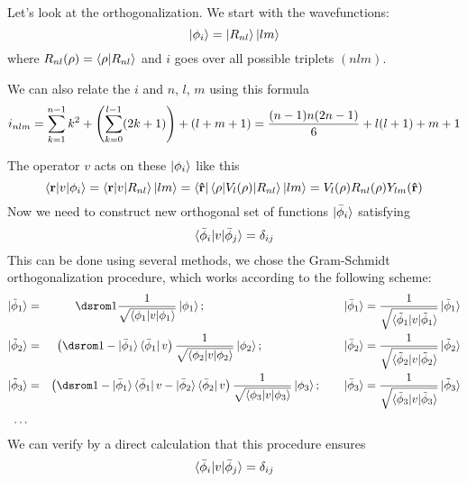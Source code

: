 Let's look at the orthogonalization. We start with the wavefunctions: 
\begin{equation*}
  \mathinner{|{\phi_i}\rangle}=\mathinner{|{R_{nl}}\rangle}\mathinner{|{lm}\rangle}
\end{equation*}
where $R_{nl}(\rho)=\mathinner{\langle{\rho|R_{nl}}\rangle}$ and $i$ goes over all possible triplets $(nlm)$.

We can also relate the $i$ and $n$, $l$, $m$ using this formula
\begin{equation*}
  i_{nlm}=\sum_{k=1}^{n-1}k^2+\left(\sum_{k=0}^{l-1} (2k+1)\right) + (l+m+1)= {(n-1)n(2n-1)\over6} + l(l+1)+m+1
\end{equation*}

The operator $v$ acts on these $\mathinner{|{\phi_i}\rangle}$ like this 
\begin{equation*}
  \mathinner{\langle{{\bf r}|v|\phi_i}\rangle} =\mathinner{\langle{{\bf r}|v|R_{nl}}\rangle}\mathinner{|{lm}\rangle} =\mathinner{\langle{{\bf\hat r}}|}\mathinner{\langle{\rho|V_l(\rho)|R_{nl}}\rangle}\mathinner{|{lm}\rangle} =V_l(\rho)R_{nl}(\rho)Y_{lm}({\bf\hat r})
\end{equation*}
Now we need to construct new orthogonal set of functions $\mathinner{|{\bar\phi_i}\rangle}$ satisfying 
\begin{equation*}
  \mathinner{\langle{\bar\phi_i|v|\bar\phi_j}\rangle}=\delta_{ij}
\end{equation*}
This can be done using several methods, we chose the Gram-Schmidt orthogonalization procedure, which works according to the following scheme: 
\begin{eqnarray*}
\ket{\tilde\phi_1}&=&\one{1\over\sqrt{\braket{\phi_1|v|\phi_1}}}\ket{\phi_1} ;\quad\quad \quad\quad\quad\quad\quad \quad\quad\quad\quad\quad \ket{\bar\phi_1}={1\over\sqrt{\braket{\tilde\phi_1|v|\tilde\phi_1}}} \ket{\tilde\phi_1} \\
\ket{\tilde\phi_2}&=& \left(\one -\ket{\bar\phi_1}\bra{\bar\phi_1}v \right){1\over\sqrt{\braket{\phi_2|v|\phi_2}}}\ket{\phi_2};\quad\quad \quad\quad\quad\quad\quad \ket{\bar\phi_2}={1\over\sqrt{\braket{\tilde\phi_2|v|\tilde\phi_2}}} \ket{\tilde\phi_2} \\
\ket{\tilde\phi_3}&=& \left(\one -\ket{\bar\phi_1}\bra{\bar\phi_1}v -\ket{\bar\phi_2}\bra{\bar\phi_2}v \right){1\over\sqrt{\braket{\phi_3|v|\phi_3}}}\ket{\phi_3};\quad\quad \ket{\bar\phi_3}={1\over\sqrt{\braket{\tilde\phi_3|v|\tilde\phi_3}}} \ket{\tilde\phi_3} \\
\dots& \\
\end{eqnarray*}
 We can verify by a direct calculation that this procedure ensures 
\begin{equation*}
  \mathinner{\langle{\bar\phi_i|v|\bar\phi_j}\rangle}=\delta_{ij}
\end{equation*}
